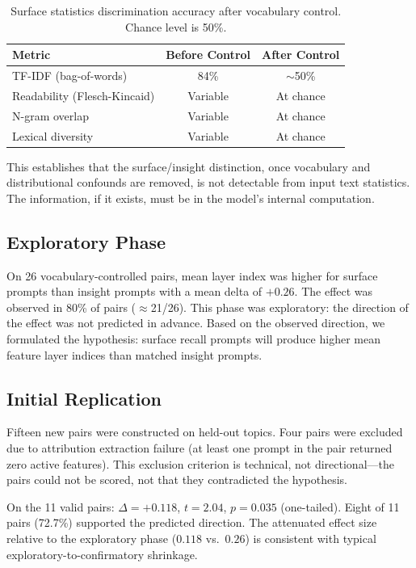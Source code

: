 \documentclass[10pt]{article}
\begin{document}
\begin{table}[h]
\centering
\caption{Surface statistics discrimination accuracy after vocabulary control. Chance level is 50\%.}
\label{tab:surface_stats}
\begin{tabular}{lcc}
\toprule
\textbf{Metric} & \textbf{Before Control} & \textbf{After Control} \\
\midrule
TF-IDF (bag-of-words) & 84\% & $\sim$50\% \\
Readability (Flesch-Kincaid) & Variable & At chance \\
N-gram overlap & Variable & At chance \\
Lexical diversity & Variable & At chance \\
\bottomrule
\end{tabular}
\end{table}

This establishes that the surface/insight distinction, once vocabulary and distributional confounds are removed, is not detectable from input text statistics. The information, if it exists, must be in the model's internal computation.

\subsection{Exploratory Phase}

On 26 vocabulary-controlled pairs, mean layer index was higher for surface prompts than insight prompts with a mean delta of $+0.26$. The effect was observed in 80\% of pairs ($\approx$21/26). This phase was exploratory: the direction of the effect was not predicted in advance. Based on the observed direction, we formulated the hypothesis: surface recall prompts will produce higher mean feature layer indices than matched insight prompts.

\subsection{Initial Replication}
\label{sec:initial_rep}

Fifteen new pairs were constructed on held-out topics. Four pairs were excluded due to attribution extraction failure (at least one prompt in the pair returned zero active features). This exclusion criterion is technical, not directional---the pairs could not be scored, not that they contradicted the hypothesis.

On the 11 valid pairs: $\Delta{=}+0.118$, $t{=}2.04$, $p{=}0.035$ (one-tailed). Eight of 11 pairs (72.7\%) supported the predicted direction. The attenuated effect size relative to the exploratory phase ($0.118$ vs.\ $0.26$) is consistent with typical exploratory-to-confirmatory shrinkage.
\end{document}
